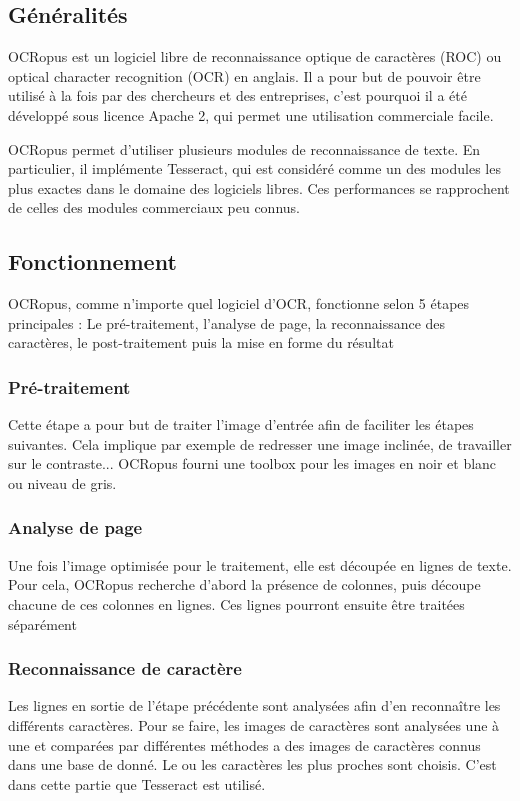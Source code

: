 \subsection{Généralités}
	OCRopus est un logiciel libre de reconnaissance optique de caractères (ROC) ou optical character recognition (OCR) en anglais. Il a pour but de pouvoir être utilisé à la fois par des chercheurs et des entreprises\cite{articleOCRopus}, c'est pourquoi il a été développé sous licence Apache 2, qui permet une utilisation commerciale facile. 

	OCRopus permet d'utiliser plusieurs modules de reconnaissance de texte. En particulier, il implémente Tesseract, qui est considéré comme un des modules les plus exactes dans le domaine des logiciels libres. Ces performances se rapprochent de celles des modules commerciaux peu connus.

\subsection{Fonctionnement}
	OCRopus, comme n'importe quel logiciel d'OCR, fonctionne selon 5 étapes principales \cite{articleOCRopus} : Le pré-traitement, l'analyse de page, la reconnaissance des caractères, le post-traitement puis la mise en forme du résultat

	\subsubsection{Pré-traitement}
		Cette étape a pour but de traiter l'image d'entrée afin de faciliter les étapes suivantes. Cela implique par exemple de redresser une image inclinée, de travailler sur le contraste... OCRopus fourni une toolbox pour les images en noir et blanc ou niveau de gris.

	\subsubsection{Analyse de page}
		Une fois l'image optimisée pour le traitement, elle est découpée en lignes de texte. Pour cela, OCRopus recherche d'abord la présence de colonnes, puis découpe chacune de ces colonnes en lignes. Ces lignes pourront ensuite être traitées séparément

	\subsubsection{Reconnaissance de caractère}
		Les lignes en sortie de l'étape précédente sont analysées afin d'en reconnaître les différents caractères. Pour se faire, les images de caractères sont analysées une à une et comparées par différentes méthodes a des images de caractères connus dans une base de donné. Le ou les caractères les plus proches sont choisis. C'est dans cette partie que Tesseract est utilisé.

